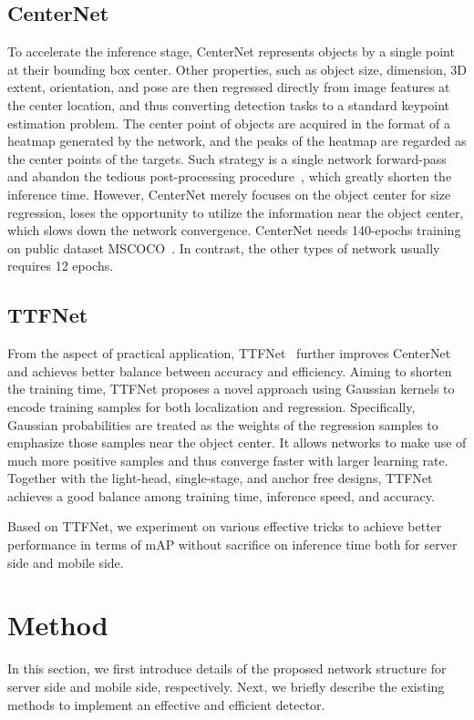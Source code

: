 \documentclass[10pt,twocolumn,letterpaper]{article}
\begin{document}
    \subsection{CenterNet}
To accelerate the inference stage, CenterNet represents objects by a single point at their bounding box center. Other properties, such as object size, dimension, 3D extent, orientation, and pose are then regressed directly from image features at the center location, and thus converting detection tasks to a standard keypoint estimation problem. The center point of objects are acquired in the format of a heatmap generated by the network, and the peaks of the heatmap are regarded as the center points of  the targets. Such strategy is a single network forward-pass and abandon the tedious post-processing procedure~\cite{nms2006,soft-nms2017,nmw2017,nmw2017-2,wbf2019}, which greatly shorten the inference time. However, CenterNet merely focuses on the object center for size regression, loses the opportunity to utilize the information near the object center, which slows down the network convergence. CenterNet needs 140-epochs training on public dataset MSCOCO~\cite{Lin2014MicrosoftCC}. In contrast, the other types of network usually requires 12 epochs.
    
    \subsection{TTFNet}
From the aspect of practical application,  TTFNet~\cite{ttfnet2020} further improves CenterNet and achieves better balance between accuracy and efficiency. Aiming to shorten the training time, TTFNet proposes a novel approach using Gaussian kernels to encode training samples for both localization and regression. Specifically,  Gaussian probabilities are treated as the weights of the regression samples to emphasize those samples near the object center. It allows networks to make use of much more positive samples and thus converge faster with larger learning rate. Together with the light-head, single-stage, and anchor free designs, TTFNet achieves a good balance among training time, inference speed, and accuracy.
    
    Based on TTFNet, we experiment on various effective tricks to achieve better performance in terms of mAP without sacrifice on inference time both for server side and mobile side.
    






	\section{Method}
	In this section, we first introduce details of the proposed network structure for server side and mobile side, respectively. Next, we briefly describe the existing methods to implement an effective and efficient detector.
	
\end{document}
